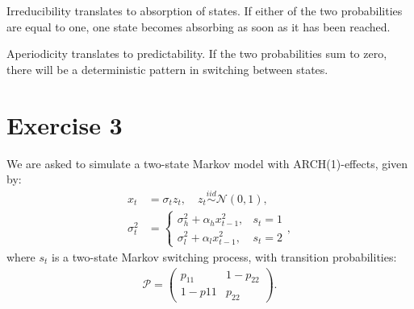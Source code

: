 \documentclass[11pt,a4paper,oneside]{article}
\newcommand{\lp}{\left(}
\newcommand{\rp}{\right)}
\newcommand{\pp}{\mathcal{P}}
\newcommand{\nnn}{\mathcal{N}}
\newcommand{\iid}{\overset{iid}{\sim}}
\begin{document}
Irreducibility translates to absorption of states. If either of the two probabilities are equal to one, one state becomes absorbing as soon as it has been reached.

Aperiodicity translates to predictability. If the two probabilities sum to zero, there will be a deterministic pattern in switching between states.



\clearpage

\section{Exercise 3}
\renewcommand{\theequation}{3.\arabic{equation}}
\setcounter{equation}{0}
We are asked to simulate a two-state Markov model with ARCH(1)-effects, given by:
\begin{align}
    x_t &= \sigma_t z_t, \quad z_t \iid\nnn\lp 0, 1\rp, \\
    \sigma_t^2
        &= \begin{cases}
            \sigma_h^2 + \alpha_h x_{t-1}^2, & s_t = 1\\
            \sigma_l^2 + \alpha_l x_{t-1}^2, & s_t = 2
            \end{cases},
\end{align}
where $s_t$ is a two-state Markov switching process, with transition probabilities:
\begin{align*}
    \pp = 
        \begin{pmatrix}
            p_{11} & 1 - p_{22} \\
            1 - p{11} & p_{22}
        \end{pmatrix}.
\end{align*}
\end{document}
